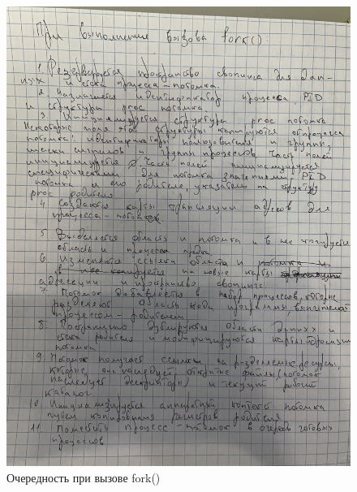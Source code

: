 \documentclass[a4paper,14pt]{article}
\begin{document}
\begin{figure}[ht]
	\centering
	\includegraphics[scale=0.15]{6.jpeg}
	\caption{Очередность при вызове fork()}
	\label{fig:6}
\end{figure}
\end{document}
